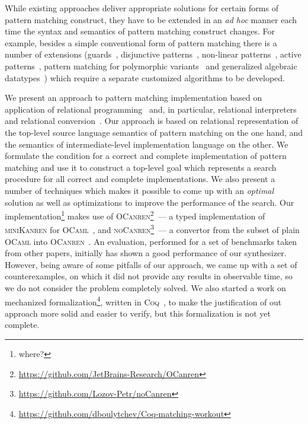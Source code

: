 While existing approaches deliver appropriate solutions for certain forms of pattern matching construct, they have to be extended in an \emph{ad hoc} manner each time
the syntax and semantics of pattern matching construct changes. For example, besides a simple conventional form of pattern matching there is a number of extensions
(guards~\cite{?}, disjunctive patterns~\cite{?}, non-linear patterns~\cite{?}, active patterns~\cite{?}, pattern matching for polymorphic variants~\cite{?} and generalized
algebraic datatypes~\cite{?}) which require a separate customized algorithms to be developed.

We present an approach to pattern matching implementation based on application of relational programming~\cite{TRS,WillThesis} and, in particular, relational interpreters~\cite{unified}
and relational conversion~\cite{conversion}. Our approach is based on relational representation of the top-level source language semantics of pattern matching on the one hand, and
the semantics of intermediate-level implementation language on the other. We formulate the condition for a correct and complete implementation of pattern matching and use it to
construct a top-level goal which represents a search procedure for all correct and complete implementations. We also present a number of techniques which makes it possible to come up with an
\emph{optimal} solution as well as optimizations to improve the performance of the search. Our implementation\footnote{where?} makes use of
\textsc{OCanren}\footnote{\url{https://github.com/JetBrains-Research/OCanren}}~--- a typed implementation of \textsc{miniKanren} for \textsc{OCaml}~\cite{OCanren},
and \textsc{noCanren}\footnote{\url{https://github.com/Lozov-Petr/noCanren}}~--- a convertor from the subset of plain \textsc{OCaml} into \textsc{OCanren}~\cite{conversion}.
An evaluation, performed for a set of benchmarks taken from other papers, initially has shown a good performance of our synthesizer. However, being aware of some pitfalls of
our approach, we came up with a set of counterexamples, on which it did not provide any results in observable time, so we do not consider the problem completely solved.
We also started a work on mechanized formalization\footnote{\url{https://github.com/dboulytchev/Coq-matching-workout}}, written in \textsc{Coq}~\cite{Coq}, to
make the justification of out approach more solid and easier to verify, but this formalization is not yet complete. 

 
